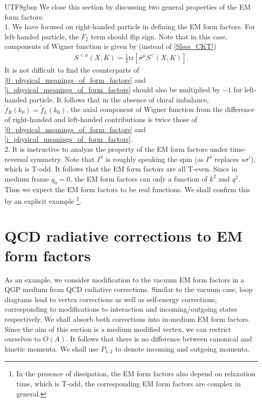\documentclass[11pt]{article}\def\baselinestretch{1.4}
\def\e{{\epsilon}}
\def\G{{\Gamma}}
\def\m{{\mu}}
\def\n{{\nu}}
\def\r{{\rho}}
\def\s{{\sigma}}
\newcommand{\tr}{\text{tr}}
\begin{document}
\begin{CJK}{UTF8}{gbsn}
We close this section by discussing two general properties of the EM form factors:\\
1. We have focused on right-handed particle in defining the EM form factors. For left-handed particle, the $F_2$ term should flip sign. %
Note that in this case, components of Wigner function is given by (instead of \eqref{Sless_CKT})
\begin{align}
S^{<\m}(X,K)=\frac{1}{2}\tr[\bar{\s}^\m S^<(X,K)].
\end{align}
It is not difficult to find the counterparts of \eqref{0_physical_meanings_of_form_factors} and \eqref{i_physical_meanings_of_form_factors} should also be multiplied by $-1$ for left-handed particle. It follows that in the absence of chiral imbalance, $\tilde{f}_R(k_0)=\tilde{f}_L(k_0)$, the axial component of Wigner function from the difference of right-handed and left-handed contributions is twice those of \eqref{0_physical_meanings_of_form_factors} and \eqref{i_physical_meanings_of_form_factors}.
\\
2. It is instructive to analyze the property of the EM form factors under time-reversal symmetry. Note that $\G^i$ is roughly speaking the spin (as $\G^i$ replaces $s\s^i$), which is T-odd. It follows that the EM form factors are all T-even. Since in medium frame $q_0=0$, the EM form factors can only a function of $k^2$ and $q^2$. Thus we expect the EM form factors to be real functions. We shall confirm this by an explicit example \footnote{In the presence of dissipation, the EM form factors also depend on relaxation time, which is T-odd, the corresponding EM form factors are complex in general.}.

\section{QCD radiative corrections to EM form factors}\label{sec_4}

As an example, we consider modification to the vacuum EM form factors in a QGP medium from QCD radiative corrections. Similar to the vacuum case, loop diagrams lead to vertex corrections as well as self-energy corrections, corresponding to modifications to interaction and incoming/outgoing states respectively. We shall absorb both corrections into in-medium EM form factors. Since the aim of this section is a medium modified vertex, we can restrict ourselves to $O(A)$. It follows that there is no difference between canonical and kinetic momenta. We shall use $P_{1,2}$ to denote incoming and outgoing momenta.
%


\end{CJK}
\end{document}
